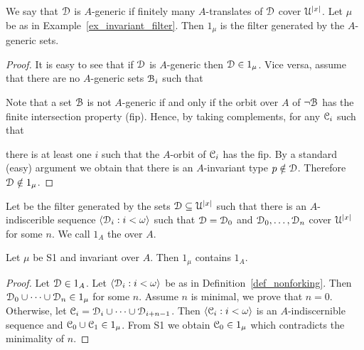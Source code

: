 \documentclass{amsproc}
\renewcommand*{\emph}[1]{%
   \smash{\tikz[baseline]\node[rectangle, fill=teal!25, rounded corners, inner xsep=0.5ex, inner ysep=0.2ex, anchor=base, minimum height = 2.7ex]{\strut #1};}}
\begin{document}
\begin{example}
  We say that $\EuScript D$ is $A$-generic if finitely many $A$-translates of $\EuScript D$ cover $\EuScript U^{|x|}$.
  Let $\mu$ be as in Example~\ref{ex_invariant_filter}.
  Then $1_\mu$ is the filter generated by the $A$-generic sets.
\end{example}
  
\begin{proof}
  It is easy to see that if $\EuScript D$ is $A$-generic then $\EuScript D\in1_\mu$.
  Vice versa, assume that there are no $A$-generic sets $\EuScript B_i$ such that 


  Note that a set $\EuScript B$ is not $A$-generic if and only if the orbit over $A$ of $\neg\EuScript B$ has the finite intersection property (fip).
  Hence, by taking complements, for any $\EuScript C_i$ such that 
  

  there is at least one $i$ such that the $A$-orbit of $\EuScript C_i$ has the fip.
  By a standard (easy) argument we obtain that there is an $A$-invariant type $p\notin\EuScript D$.
  Therefore $\EuScript D\notin1_\mu$.
\end{proof}

\begin{definition}\label{def_nonforking}
  Let \emph{$1_A$\/} be the filter generated by the sets $\EuScript D\subseteq\EuScript U^{|x|}$ such that there is an $A$-indiscerible sequence $\langle \EuScript D_i:i<\omega\rangle$ such that $\EuScript D=\EuScript D_0$ and $\EuScript D_0,\dots,\EuScript D_n$ cover $\EuScript U^{|x|}$ for some $n$.
  We call $1_A$ the \emph{nonforking filter\/} over $A$.
\end{definition}

\begin{fact}
  Let $\mu$ be S1 and invariant over $A$.
  Then $1_\mu$ contains $1_A$.
\end{fact}

\begin{proof}
  Let $\EuScript D\in 1_A$. 
  Let $\langle \EuScript D_i:i<\omega\rangle$ be as in Definition~\ref{def_nonforking}.
  Then $\EuScript D_0\cup\dots\cup\EuScript D_n\in1_\mu$ for some $n$.
  Assume $n$ is minimal, we prove that $n=0$.
  Otherwise, let $\EuScript C_i=\EuScript D_i\cup\dots\cup\EuScript D_{i+n-1}$.
  Then $\langle \EuScript C_i:i<\omega\rangle$ is an $A$-indiscernible sequence and $\EuScript C_0\cup\EuScript C_1\in1_\mu$.
  From S1 we obtain $\EuScript C_0\in1_\mu$ which contradicts the minimality of $n$.
\end{proof}
\end{document}

